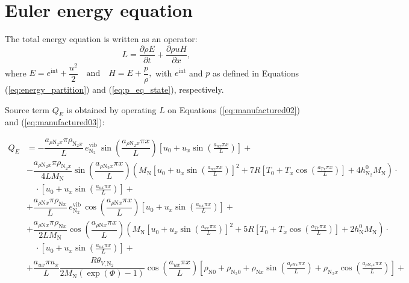 \documentclass[10pt]{article}
\newcommand{\diff}[2] {\dfrac{\partial #1 }{\partial #2}}
\begin{document}
\section{Euler energy equation}
The total energy equation is written as an operator:
\begin{equation}
 \label{eq:euler1d_14}
L=\diff{\rho E}{t} + \diff{\rho u H}{x} ,
\end{equation}
where $E=e^{\text{int}} + \dfrac{u^2 }{2} \quad \mbox{and}\quad H= E+ \dfrac{p}{\rho},$ with $e^{\text{int}}$ and $p$ as defined in Equations (\ref{eq:energy_partition}) and (\ref{eq:p_eq_state}), respectively.

Source term $Q_E$ is obtained by operating $L$ on Equations (\ref{eq:manufactured02}) and (\ref{eq:manufactured03}):

\begin{equation}
\begin{split}
Q_E &= - \dfrac{a_{\rho \text{N}_2 x} \pi \rho_{\text{N}_2 x}}{L}  \, e^{\text{vib}}_{\text{N}_2}\, \sin\left(\dfrac{a_{\rho \text{N}_2 x} \pi x}{L}\right)  \left[u_{0}+u_{x} \sin\left(\frac{a_{u x} \pi x}{L}\right)\right] +\\
&-\dfrac{a_{\rho \text{N}_2 x} \pi \rho_{\text{N}_2 x}}{4L M_\text{N}} \sin\left(\dfrac{a_{\rho \text{N}_2 x} \pi x}{L}\right)  \left( M_\text{N}  \left[u_{0}+u_{x} \sin\left(\frac{a_{u x} \pi x}{L}\right)\right]^2+7 R \left[T_{0}+T_{x} \cos\left(\frac{a_{T x} \pi x}{L}\right)\right]+4 h^{0}_{\text{N}_2} M_\text{N}\right) \cdot \\
    &\quad \cdot\left[u_{0}+u_{x} \sin\left(\frac{a_{u x} \pi x}{L}\right)\right]+\\
&+ \dfrac{ a_{\rho \text{N} x} \pi \rho_{\text{N}x}}{L}  \, e^{\text{vib}}_{\text{N}_2}\,\cos\left(\dfrac{a_{\rho \text{N} x} \pi x}{L}\right)  \left[u_{0}+u_{x} \sin\left(\frac{a_{u x} \pi x}{L}\right)\right] +\\
&+ \dfrac{a_{\rho \text{N} x} \pi \rho_{\text{N}x}}{2L M_\text{N}} \cos\left(\dfrac{a_{\rho \text{N} x} \pi x}{L}\right)\left(M_\text{N}  \left[u_{0}+u_{x} \sin\left(\frac{a_{u x} \pi x}{L}\right)\right]^2+5 R \left[T_{0}+T_{x} \cos\left(\frac{a_{T x} \pi x}{L}\right)\right]+2 h^{0}_{\text{N}} M_\text{N}\right) \cdot \\
    &\quad \cdot\left[u_{0}+u_{x} \sin\left(\frac{a_{u x} \pi x}{L}\right)\right]+\\
&+ \dfrac{a_{ux} \pi u_x}{L}\dfrac{ R \theta_{V,\text{N}_2}}{2 M_\text{N} \left( \exp(\Phi) -1 \right)}\cos\left(\dfrac{a_{ux} \pi x}{L}\right) \left[\rho_{\text{N}0} + \rho_{\text{N}_2 0} + \rho_{\text{N}x} \sin\left(\frac{a_{  \rho \text{N} x }\pi x}{L}\right) + \rho_{\text{N}_2 x} \cos\left(\frac{a_{ \rho \text{N}_2 x } \pi x}{L}\right)\right] +\\

\end{split}
\end{equation}
\end{document}
